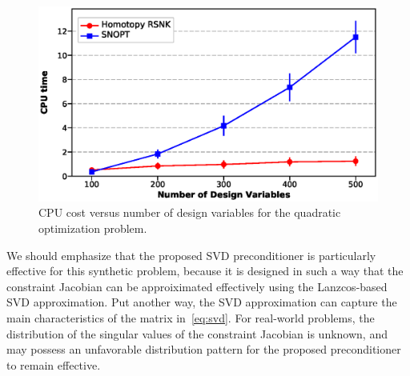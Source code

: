 \begin{figure}[tbp]
  \centering
  \includegraphics[clip,width=1.0\textwidth]{./figs/chap4_test/random_100_color.eps}%
  \caption{CPU cost versus number of design variables for the quadratic
    optimization problem.\label{fig:quad_scale}}
\end{figure}

We should emphasize that the proposed SVD preconditioner is particularly effective for this synthetic problem, because it is designed in such a way that the constraint Jacobian can be approiximated effectively using the Lanzcos-based SVD approximation.
Put another way, the SVD approximation can capture the main characteristics of the matrix in~\eqref{eq:svd}. For real-world problems, the distribution of the singular values of the constraint Jacobian is unknown, and may possess an unfavorable distribution pattern for the proposed preconditioner to remain effective.



